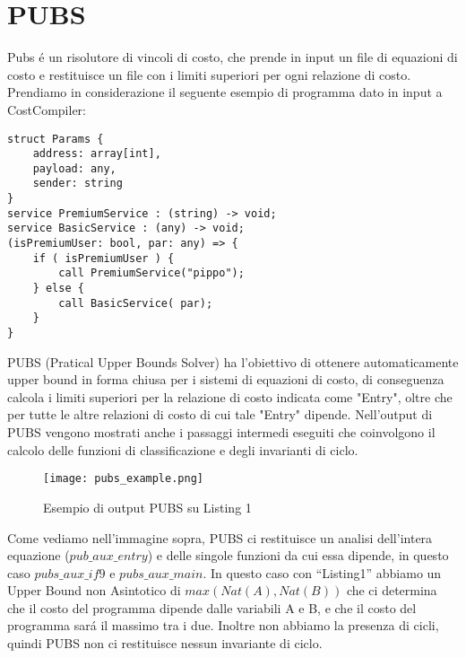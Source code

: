 \documentclass[../../main.tex]{subfiles}
\begin{document}
\section{PUBS}
\label{sec:pubs}
Pubs é un risolutore di vincoli di costo, che prende in input un file di equazioni di costo e restituisce un file con i limiti superiori per ogni relazione di costo.
Prendiamo in considerazione il seguente esempio di programma dato in input a CostCompiler:
\begin{lstlisting}[caption={Listing 1}]
struct Params {
	address: array[int],
	payload: any,
	sender: string
}
service PremiumService : (string) -> void;
service BasicService : (any) -> void;
(isPremiumUser: bool, par: any) => {
	if ( isPremiumUser ) {
		call PremiumService("pippo");
	} else {
		call BasicService( par);
	}
}
\end{lstlisting}

PUBS (Pratical Upper Bounds Solver) ha l'obiettivo di ottenere automaticamente upper bound in forma chiusa per i sistemi di equazioni di costo, di conseguenza calcola i limiti superiori per la relazione di costo indicata come "Entry", oltre che per tutte le altre relazioni di costo di cui tale "Entry" dipende.
Nell'output di PUBS vengono mostrati anche i passaggi intermedi eseguiti che coinvolgono il calcolo delle funzioni di classificazione e degli invarianti di ciclo.

\begin{figure}[H]
    \centering
    \texttt{[image: pubs\_example.png]}
    \caption{Esempio di output PUBS su Listing 1}
\end{figure}
Come vediamo nell'immagine sopra, PUBS ci restituisce un analisi dell'intera equazione ($pub\_aux\_entry$) e delle singole funzioni da cui essa dipende, in questo caso $pubs\_aux\_if9$ e $pubs\_aux\_main$.
In questo caso con ``Listing1'' abbiamo un Upper Bound non Asintotico di $max(Nat(A), Nat(B))$ che ci determina che il costo del programma dipende dalle variabili A e B, e che il costo del programma sará il massimo tra i due.
Inoltre non abbiamo la presenza di cicli, quindi PUBS non ci restituisce nessun invariante di ciclo.
\end{document}
